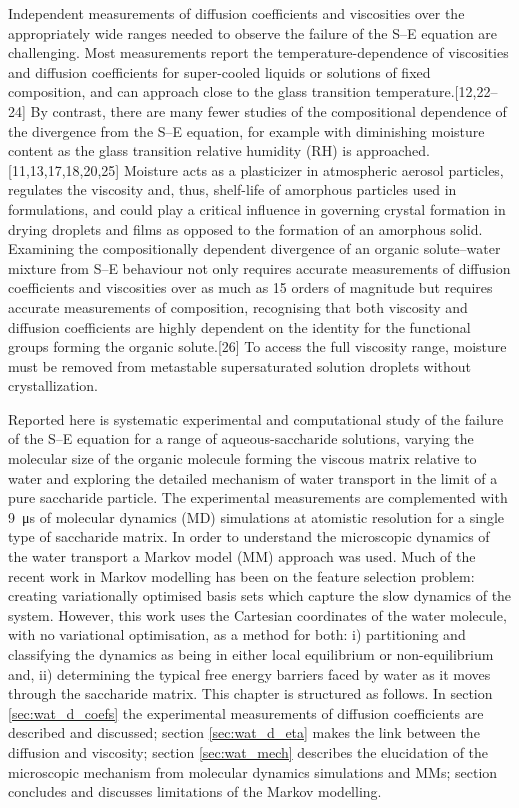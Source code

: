 Independent measurements of diffusion coefficients and viscosities over the appropriately wide ranges needed to observe the failure of the S–E equation are challenging. Most measurements report the temperature-dependence of viscosities and diffusion coefficients for super-cooled liquids or solutions of fixed composition, and can approach close to the glass transition temperature.[12,22–24] By contrast, there are many fewer studies of the compositional dependence of the divergence from the S–E equation, for example with diminishing moisture content as the glass transition relative humidity (RH) is approached.[11,13,17,18,20,25] Moisture acts as a plasticizer in atmospheric aerosol particles, regulates the viscosity and, thus, shelf-life of amorphous particles used in formulations, and could play a critical influence in governing crystal formation in drying droplets and films as opposed to the formation of an amorphous solid. Examining the compositionally dependent divergence of an organic solute–water mixture from S–E behaviour not only requires accurate measurements of diffusion coefficients and viscosities over as much as \num{15} orders of magnitude but requires accurate measurements of composition, recognising that both viscosity and diffusion coefficients are highly dependent on the identity for the functional groups forming the organic solute.[26] To access the full viscosity range, moisture must be removed from metastable supersaturated solution droplets without crystallization. 

Reported here is systematic experimental and computational study of the failure of the S–E equation for a range of aqueous-saccharide solutions, varying the molecular size of the organic molecule forming the viscous matrix relative to water and exploring the detailed mechanism of water transport in the limit of a pure saccharide particle. The experimental measurements are complemented with \SI{9}{\micro\second} of molecular dynamics (MD) simulations at atomistic resolution for a single type of saccharide matrix.  In order to understand the microscopic dynamics of the water transport a Markov model (MM) approach was used. Much of the recent work \cite{schererVariationalSelectionFeatures2019}\cite{husicMarkovStateModels2018} in Markov modelling has been on the feature selection problem: creating variationally optimised basis sets which capture the slow dynamics of the system. However, this work uses the Cartesian coordinates of the water molecule, with no variational optimisation, as a method for both: i) partitioning and classifying the dynamics as being in either local equilibrium or non-equilibrium and, ii) determining the typical free energy barriers faced by water as it moves through the saccharide matrix. This chapter is structured as follows. In section \ref{sec:wat_d_coefs} the experimental measurements of diffusion coefficients are described and discussed; section \ref{sec:wat_d_eta} makes the link  between the diffusion and viscosity; section \ref{sec:wat_mech} describes the elucidation of the microscopic mechanism from molecular dynamics simulations and MMs; section \label{sec:wat_conclusions} concludes and discusses limitations of the Markov modelling. 


